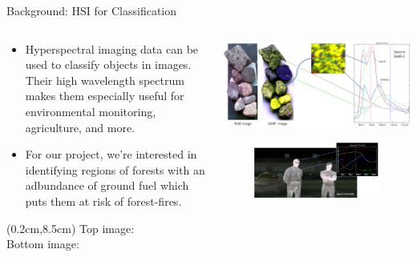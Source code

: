\documentclass[aspectratio=169,xcolor=dvipsnames]{beamer}
\begin{document}
\begin{frame}{Background: HSI for Classification}
    \begin{columns}
        \begin{column}{0.53\textwidth}
            \begin{itemize}
                \item Hyperspectral imaging data can be used to classify objects in images. Their high wavelength spectrum makes them especially useful for environmental monitoring, agriculture, and more.
                \item For our project, we're interested in identifying regions of forests with an adbundance of ground fuel which puts them at risk of forest-fires.
            \end{itemize}


            \begin{textblock*}{5cm}(0.2cm,8.5cm)
                \tiny Top image: \cite{hsi-stones} \\ Bottom image: \cite{hsi-people}
            \end{textblock*}


        \end{column}
        \begin{column}{0.43\textwidth}
            \includegraphics[width=\textwidth]{wiki_hsi2.png}
            \begin{figure}
                \centering
                \includegraphics[width=\textwidth]{wiki_hsi1.png}
            \end{figure}
        \end{column}
    \end{columns}
\end{frame}
\end{document}
